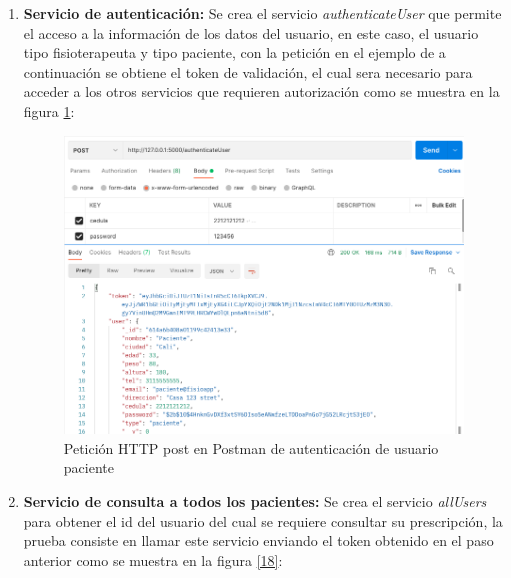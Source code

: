 \documentclass[12pt]{article}
\begin{document}
\begin{enumerate}
    \item \textbf{Servicio de autenticación:} 
    Se crea el servicio \textit{authenticateUser} que permite el acceso a la información de los datos del usuario, en este caso, el usuario tipo fisioterapeuta y tipo paciente, con la petición en el ejemplo de a continuación se obtiene el token de validación, el cual sera necesario para acceder a los otros servicios que requieren autorización como se muestra en la figura \ref{17}:
           
            \begin{figure}[ht]
            \centering
            \includegraphics[scale=0.35]{imag/pacienteau.png}
            \caption{Petición HTTP post en Postman de autenticación de usuario paciente}
            \label{17}
            \end{figure}
            \FloatBarrier
            
    \item \textbf{Servicio de consulta a todos los pacientes:} 
    Se crea el servicio \textit{allUsers} para obtener el id del usuario del cual se requiere consultar su prescripción, la prueba consiste en llamar este servicio enviando el token obtenido en el paso anterior como se muestra en la figura \ref{18}:
    

\end{enumerate}
\end{document}
